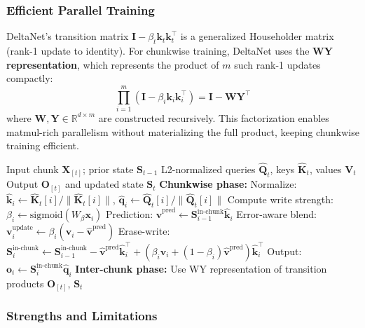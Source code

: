 \documentclass[11pt,a4paper]{article}
\begin{document}
\subsubsection{Efficient Parallel Training}

DeltaNet's transition matrix $\mathbf{I} - \beta_t \mathbf{k}_t \mathbf{k}_t^\top$ is a generalized Householder matrix (rank-1 update to identity). For chunkwise training, DeltaNet uses the \textbf{WY representation}, which represents the product of $m$ such rank-1 updates compactly:
\[
\prod_{i=1}^{m} (\mathbf{I} - \beta_i \mathbf{k}_i \mathbf{k}_i^\top) = \mathbf{I} - \mathbf{W}\mathbf{Y}^\top
\]
where $\mathbf{W}, \mathbf{Y} \in \mathbb{R}^{d \times m}$ are constructed recursively. This factorization enables matmul-rich parallelism without materializing the full product, keeping chunkwise training efficient.

\begin{algorithm}[H]
\caption{DeltaNet State Update with WY Representation}
\begin{algorithmic}[1]
\Require Input chunk $\mathbf{X}_{[t]}$; prior state $\mathbf{S}_{t-1}$
\Require L2-normalized queries $\hat{\mathbf{Q}}_t$, keys $\hat{\mathbf{K}}_t$, values $\mathbf{V}_t$
\Ensure Output $\mathbf{O}_{[t]}$ and updated state $\mathbf{S}_t$
\State \textbf{Chunkwise phase:}
    \State Normalize: $\hat{\mathbf{k}}_i \gets \hat{\mathbf{K}}_t[i] / \|\hat{\mathbf{K}}_t[i]\|$, $\hat{\mathbf{q}}_i \gets \hat{\mathbf{Q}}_t[i] / \|\hat{\mathbf{Q}}_t[i]\|$
    \State Compute write strength: $\beta_i \gets \text{sigmoid}(W_\beta \mathbf{x}_i)$
    \State Prediction: $\hat{\mathbf{v}}^\text{pred} \gets \mathbf{S}_{i-1}^\text{in-chunk} \hat{\mathbf{k}}_i$
    \State Error-aware blend: $\mathbf{v}_i^\text{update} \gets \beta_i(\mathbf{v}_i - \hat{\mathbf{v}}^\text{pred})$
    \State Erase-write: $\mathbf{S}_i^\text{in-chunk} \gets \mathbf{S}_{i-1}^\text{in-chunk} - \hat{\mathbf{v}}^\text{pred}\hat{\mathbf{k}}_i^\top + (\beta_i \mathbf{v}_i + (1-\beta_i)\hat{\mathbf{v}}^\text{pred})\hat{\mathbf{k}}_i^\top$
    \State Output: $\mathbf{o}_i \gets \mathbf{S}_i^\text{in-chunk} \hat{\mathbf{q}}_i$
\EndFor
\State \textbf{Inter-chunk phase:} Use WY representation of transition products
\Return $\mathbf{O}_{[t]}$, $\mathbf{S}_{t}$
\end{algorithmic}
\end{algorithm}

\subsubsection{Strengths and Limitations}
\end{document}

